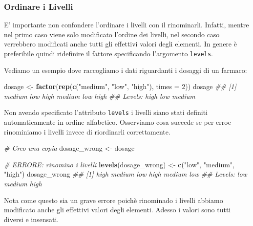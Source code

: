 \documentclass[
]{book}
\newenvironment{Shaded}{\begin{snugshade}}{\end{snugshade}}
\newcommand{\CommentTok}[1]{\textcolor[rgb]{0.56,0.35,0.01}{\textit{#1}}}
\newcommand{\DataTypeTok}[1]{\textcolor[rgb]{0.13,0.29,0.53}{#1}}
\newcommand{\DecValTok}[1]{\textcolor[rgb]{0.00,0.00,0.81}{#1}}
\newcommand{\KeywordTok}[1]{\textcolor[rgb]{0.13,0.29,0.53}{\textbf{#1}}}
\newcommand{\NormalTok}[1]{#1}
\newcommand{\StringTok}[1]{\textcolor[rgb]{0.31,0.60,0.02}{#1}}
\begin{document}
\hypertarget{ordinare-i-livelli}{%
\subsubsection*{Ordinare i Livelli}\label{ordinare-i-livelli}}

E' importante non confondere l'ordinare i livelli con il rinominarli. Infatti, mentre nel primo caso viene solo modificato l'ordine dei livelli, nel secondo caso verrebbero modificati anche tutti gli effettivi valori degli elementi. In genere è preferibile quindi ridefinire il fattore specificando l'argomento \texttt{levels}.

Vediamo un esempio dove raccogliamo i dati riguardanti i dosaggi di un farmaco:

\begin{Shaded}
\begin{Highlighting}[]
\NormalTok{dosage <-}\StringTok{ }\KeywordTok{factor}\NormalTok{(}\KeywordTok{rep}\NormalTok{(}\KeywordTok{c}\NormalTok{(}\StringTok{"medium"}\NormalTok{, }\StringTok{"low"}\NormalTok{, }\StringTok{"high"}\NormalTok{), }\DataTypeTok{times =} \DecValTok{2}\NormalTok{))}
\NormalTok{dosage}
\CommentTok{## [1] medium low    high   medium low    high  }
\CommentTok{## Levels: high low medium}
\end{Highlighting}
\end{Shaded}

Non avendo specificato l'attributo \texttt{levels} i livelli siano stati definiti automaticamente in ordine alfabetico. Osserviamo cosa succede se per erroe rinominiamo i livelli invece di riordinarli correttamente.

\begin{Shaded}
\begin{Highlighting}[]
\CommentTok{# Creo una copia}
\NormalTok{dosage_wrong <-}\StringTok{ }\NormalTok{dosage}

\CommentTok{# ERRORE: rinomino i livelli}
\KeywordTok{levels}\NormalTok{(dosage_wrong) <-}\StringTok{ }\KeywordTok{c}\NormalTok{(}\StringTok{"low"}\NormalTok{, }\StringTok{"medium"}\NormalTok{, }\StringTok{"high"}\NormalTok{)}
\NormalTok{dosage_wrong}
\CommentTok{## [1] high   medium low    high   medium low   }
\CommentTok{## Levels: low medium high}
\end{Highlighting}
\end{Shaded}

Nota come questo sia un grave errore poichè rinominado i livelli abbiamo modificato anche gli effettivi valori degli elementi. Adesso i valori sono tutti diversi e insensati.
\end{document}
